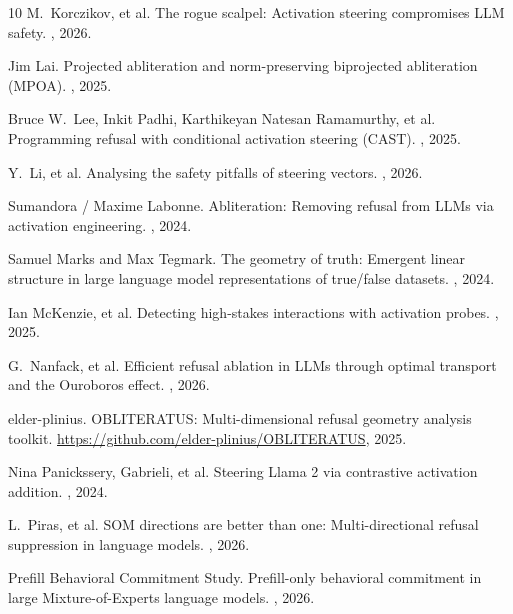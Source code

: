 \documentclass{article}
\begin{document}
\begin{thebibliography}{10}
M.\ Korczikov, et al.
\newblock The rogue scalpel: Activation steering compromises LLM safety.
, 2026.

Jim Lai.
\newblock Projected abliteration and norm-preserving biprojected abliteration (MPOA).
, 2025.

Bruce W.\ Lee, Inkit Padhi, Karthikeyan Natesan Ramamurthy, et al.
\newblock Programming refusal with conditional activation steering (CAST).
, 2025.

Y.\ Li, et al.
\newblock Analysing the safety pitfalls of steering vectors.
, 2026.

Sumandora / Maxime Labonne.
\newblock Abliteration: Removing refusal from LLMs via activation engineering.
, 2024.

Samuel Marks and Max Tegmark.
\newblock The geometry of truth: Emergent linear structure in large language model representations of true/false datasets.
, 2024.

Ian McKenzie, et al.
\newblock Detecting high-stakes interactions with activation probes.
, 2025.

G.\ Nanfack, et al.
\newblock Efficient refusal ablation in LLMs through optimal transport and the Ouroboros effect.
, 2026.

elder-plinius.
\newblock OBLITERATUS: Multi-dimensional refusal geometry analysis toolkit.
\newblock \url{https://github.com/elder-plinius/OBLITERATUS}, 2025.

Nina Panickssery, Gabrieli, et al.
\newblock Steering Llama 2 via contrastive activation addition.
, 2024.

L.\ Piras, et al.
\newblock SOM directions are better than one: Multi-directional refusal suppression in language models.
, 2026.

Prefill Behavioral Commitment Study.
\newblock Prefill-only behavioral commitment in large Mixture-of-Experts language models.
, 2026.


\end{thebibliography}
\end{document}
